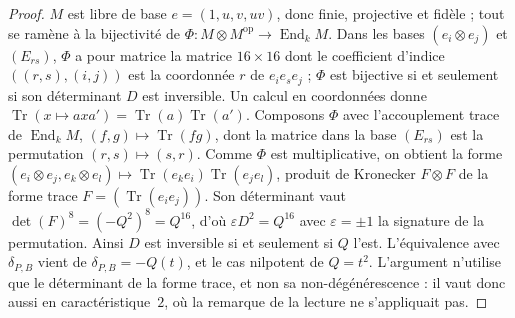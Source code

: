 \begin{proof}
$M$ est libre de base $e = (1, u, v, uv)$, donc finie, projective et fidèle ; tout se ramène à la bijectivité de $\Phi : M \otimes M^{\mathrm{op}} \to \operatorname{End}_k M$. Dans les bases $(e_i \otimes e_j)$ et $(E_{rs})$, $\Phi$ a pour matrice la matrice $16 \times 16$ dont le coefficient d'indice $((r, s), (i, j))$ est la coordonnée $r$ de $e_ie_se_j$ ; $\Phi$ est bijective si et seulement si son déterminant $D$ est inversible. Un calcul en coordonnées donne $\operatorname{Tr}(x \mapsto axa') = \operatorname{Tr}(a)\operatorname{Tr}(a')$. Composons $\Phi$ avec l'accouplement trace de $\operatorname{End}_k M$, $(f, g) \mapsto \operatorname{Tr}(fg)$, dont la matrice dans la base $(E_{rs})$ est la permutation $(r, s) \mapsto (s, r)$. Comme $\Phi$ est multiplicative, on obtient la forme $(e_i \otimes e_j, e_k \otimes e_l) \mapsto \operatorname{Tr}(e_ke_i)\operatorname{Tr}(e_je_l)$, produit de Kronecker $F \otimes F$ de la forme trace $F = (\operatorname{Tr}(e_ie_j))$. Son déterminant vaut $\det(F)^8 = (-Q^2)^8 = Q^{16}$, d'où $\varepsilon D^2 = Q^{16}$ avec $\varepsilon = \pm 1$ la signature de la permutation. Ainsi $D$ est inversible si et seulement si $Q$ l'est. L'équivalence avec $\delta_{P,B}$ vient de $\delta_{P,B} = -Q(t)$, et le cas nilpotent de $Q = t^2$. L'argument n'utilise que le déterminant de la forme trace, et non sa non-dégénérescence : il vaut donc aussi en caractéristique~$2$, où la remarque de la lecture ne s'appliquait pas.
\end{proof}

